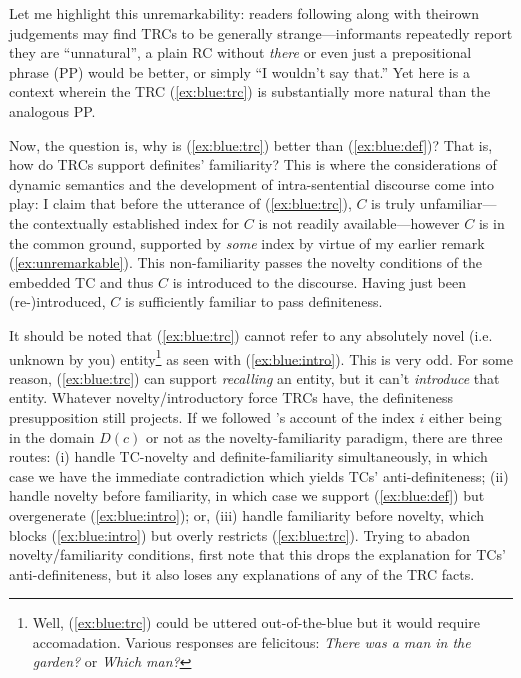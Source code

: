\documentclass[11pt]{article}
\begin{document}
\begin{exe}
	\label{ex:blue:def}
	\label{ex:blue:trc}
\end{exe}

Let me highlight this unremarkability: readers following along with theirown judgements may find TRCs to be generally strange---informants repeatedly report they are ``unnatural'', a plain RC without \textit{there} or even just a prepositional phrase (PP) would be better, or simply ``I wouldn't say that.'' Yet here is a context wherein the TRC (\ref{ex:blue:trc}) is substantially more natural than the analogous PP.

Now, the question is, why is (\ref{ex:blue:trc}) better than (\ref{ex:blue:def})? That is, how do TRCs support definites' familiarity? This is where the considerations of dynamic semantics and the development of intra-sentential discourse come into play: I claim that before the utterance of (\ref{ex:blue:trc}), \(C\) is truly unfamiliar---the contextually established index for \(C\) is not readily available---however \(C\) is in the common ground, supported by \textit{some} index by virtue of my earlier remark (\ref{ex:unremarkable}). This non-familiarity passes the novelty conditions of the embedded TC and thus \(C\) is introduced to the discourse. Having just been (re-)introduced, \(C\) is sufficiently familiar to pass definiteness.

It should be noted that (\ref{ex:blue:trc}) cannot refer to any absolutely novel (i.e. unknown by you) entity\footnote{Well, (\ref{ex:blue:trc}) could be uttered out-of-the-blue but it would require accomadation. Various responses are felicitous: \textit{There was a man in the garden?} or \textit{Which man?}} as seen with (\ref{ex:blue:intro}). This is very odd. For some reason, (\ref{ex:blue:trc}) can support \textit{recalling} an entity, but it can't \textit{introduce} that entity. Whatever novelty/introductory force TRCs have, the definiteness presupposition still projects. If we followed \citet{heimSemanticsDefiniteIndefinite1982}'s account of the index \(i\) either being in the domain \(D(c)\) or not as the novelty-familiarity paradigm, there are three routes: (i) handle TC-novelty and definite-familiarity simultaneously, in which case we have the immediate contradiction which yields TCs' anti-definiteness; (ii) handle novelty before familiarity, in which case we support (\ref{ex:blue:def}) but overgenerate (\ref{ex:blue:intro}); or, (iii) handle familiarity before novelty, which blocks (\ref{ex:blue:intro}) but overly restricts (\ref{ex:blue:trc}). Trying to abadon novelty/familiarity conditions, first note that this drops the explanation for TCs' anti-definiteness, but it also loses any explanations of any of the TRC facts.
\end{document}
